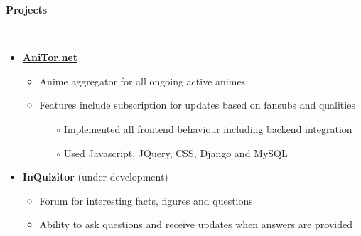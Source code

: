 \documentclass[letterpaper,11pt]{article}
\newcommand{\resitem}[1]{\item #1 \vspace{-2pt}}
\newcommand{\resheading}[1]{{\large \colorbox{mygrey}{\begin{minipage}{\textwidth}{\textbf{#1 \vphantom{p\^{E}}}}\end{minipage}}}}
\begin{document}

\newpage
\vspace{0.1in}
\resheading{Projects}
	{
	\\[20pt]
	\begin{itemize} \itemsep 1pt
		\item \large \href{http://anitor.net}{\textbf {\color {black} AniTor.net}}
				{ \vspace{-3 mm} \normalsize
				\begin{itemize} \itemsep 4pt
					\resitem{Anime aggregator for all ongoing active animes}
					\resitem{Features include subscription for updates based on fansubs and qualities}
					\begin{itemize}\itemsep 2pt
						\item[$\circ$]{Implemented all frontend behaviour including backend integration}
						\item[$\circ$]{Used Javascript, JQuery, CSS, Django and MySQL}
					\end{itemize}
				\end{itemize}
				}		
		\item \large \textbf{InQuizitor} (under development)
				{ \vspace{-3 mm} \normalsize
				\begin{itemize} \itemsep 4pt 
					\resitem{Forum for interesting facts, figures and questions}
					\resitem{Ability to ask questions and receive updates when answers are provided}
				\end{itemize}
				}
	\end{itemize}  %
}


\end{document}
